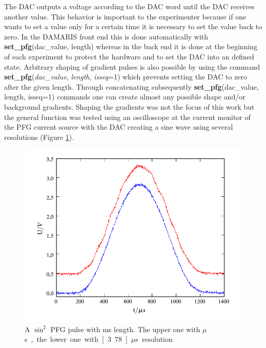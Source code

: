 \documentclass[12pt, a4paper, BCOR10mm, twoside, titlepage, headinclude]{scrbook}
\begin{document}
The DAC outputs a voltage according to the DAC word until the DAC receives another value. This behavior is important to the experimenter because if one wants to set a value only for a certain time it is necessary to set the value back to zero. In the \textsf{DAMARIS} front end this is done automatically with \textbf{set\_pfg}(dac\_value, length) whereas in the back end it is done at the beginning of each experiment to protect the hardware and to set the DAC into an defined state. 
Arbitrary shaping of gradient pulses is also possible by using the command \textbf{set\_pfg}(\textit{dac\_value}, \textit{length}, \textit{isseq}=1) which prevents setting the DAC to zero after the given length. Through concatenating subsequently \textbf{set\_pfg}(dac\_value, length, isseq=1) commands one can create almost any possible shape and/or background gradients. 
Shaping the gradients was not the focus of this work but the general function was tested using an oscilloscope at the current monitor of the PFG current source with the DAC creating a sine wave using several resolutions (Figure \ref{shapegrad}).
\begin{figure}[h]
\centering
\includegraphics[]{pics/shapegrad1}
\caption{A $\sin^2$  PFG pulse with \unit[1]{ms} length. The upper one with \unit[100]{$\mu$s}, the lower one with \unit[3.78]{$\mu$s} resolution }
\label{shapegrad}
\end{figure}
\end{document}
